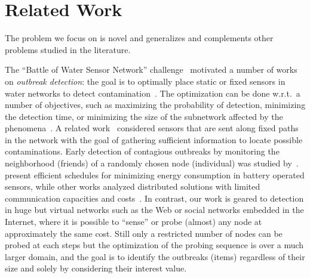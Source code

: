 \section{Related Work}\label{sec:related_work}
The problem we focus on is novel and generalizes and complements other problems
studied in the literature.

The  ``Battle of Water Sensor Network'' challenge~\citep{BWSN2008} motivated a
number of works on \emph{outbreak detection}: the goal is to optimally place
static or fixed sensors in water networks to detect
contamination~\citep{Leskovec2007,Krause2008,Hart2010}. The optimization can be
done w.r.t.~a number of objectives, such as maximizing the probability of
detection, minimizing the detection time, or minimizing the size of the
subnetwork affected by the phenomena~\citep{Leskovec2007}. A related
work~\citep{AgumbeSuresh2012} considered sensors that are sent along fixed paths
in the network with the goal of gathering sufficient information to locate
possible contaminations. Early detection of contagious outbreaks by monitoring
the neighborhood (friends) of a randomly chosen node (individual) was studied
by~\citet{Christakis2010}.  \citet{Krause2009} present efficient schedules for
minimizing energy consumption in battery operated sensors, while other works
analyzed distributed solutions with limited communication capacities and
costs~\citep{Krause2011Kleinberg,Golovin2010,Krause2011}. %
In contrast, our work is geared to detection in huge but virtual networks such
as the Web or social networks embedded in the Internet, where it is possible to
``sense'' or probe (almost) any node at approximately the same cost. Still only
a restricted number of nodes can be probed at each steps but the optimization of
the probing sequence is over a much larger domain, and the goal is to identify
the outbreaks (items) regardless of their size and solely by considering their
interest value.

